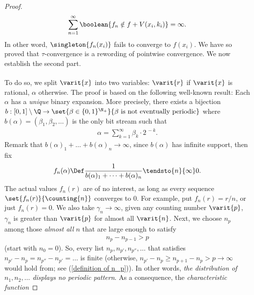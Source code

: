 \begin{proof}
\begin{align}
    \sum_{n=1}^\infty \boolean{
      f_n \notin f + V(x_i, k_i)
    } = \infty .
  \end{align}
In other word, %
%
$\singleton{f_n(x_i)}$ %
%
fails to converge to 
$f(x_i)$.
We have so proved that 
%
  $\tau$-convergence is a rewording of pointwise convergence.
%
We now establish the second part. \\%
\\\noindent
To do so, we split $\varit{x}$ into two variables: %
$\varit{r}$ if $\varit{x}$ is rational, $\alpha$ otherwise.
%
The proof is based on the following well-known result: Each $\alpha$ %
has a {\it unique} binary expansion. %
More precisely, there exists a bijection %
%
$b:[0, 1] \setminus \Q \to %
\set{\beta \in \{0, 1\}^{\N_+}}{\beta \text{ is not eventually periodic}}$ %
%
where %
$b(\alpha) = (\beta_1, \beta_2, \dots)$ %
is the only bit stream such that %
%
  \begin{align}
    \label{definition of alpha}
    \alpha = \sum_{k=1}^\infty \beta_k \cdot 2^{\,\minus k}.
  \end{align}
%
Remark that %
%
$b(\alpha)_1 + \dots + b(\alpha)_n \longrightarrow \infty$, %
%
since %
%
$b(\alpha)$
%
has infinite support, then fix %
%
  \begin{equation}
    \label{definition of f_n(alpha)}
    f_n(\alpha)\Def %
    \frac{1}{b(\alpha)_1+\cdots+ b(\alpha)_n} \tendsto{n}{\infty} 0.
  \end{equation}
%
The actual values $f_n(r)$ are of no interest, %
as long as every sequence $\set{f_n(r)}{\counting{n}}$ converges to $0$. %
For example, put $f_n(r) = r/n$, or just $f_n(r) = 0$. %
We also take %
%
  $\gamma_n \longrightarrow \infty$, \ie %
%
given any counting number $\varit{p}$, %
$\gamma_{n}$ is greater than $\varit{p}$ for almost all $\varit{n}$.
%
Next, we choose $n_{p}$ among those \textit{almost all} $\mathit{n}$ that are 
large enough to satisfy 
%
  \begin{align}
    \label{definition of n_p}
    n_p - n_{p-1} > p
  \end{align}
%
(start with $n_0=0$).
%
So, every list %
%
  $n_{p}, n_{p'}, n_{p''}, \dots $ %
%
that satisfies %
%
  $n_{p'}- n_{p} = n_{p''} - n_{p'} = \dots$ %
%
is finite %
(otherwise, %
    $n_{p'}-n_{p} \geq n_{p+1} - n_{p}  
    > p 
    \rightarrow  \infty %
    $
would hold from; see (\ref{definition of n_p})).
In other words, {\it the distribution of %
%
$\mathit{n_1, n_2, \dots}$ %
%
displays no periodic pattern}. %
As a consequence, the {\it characteristic function} %

\end{proof}

